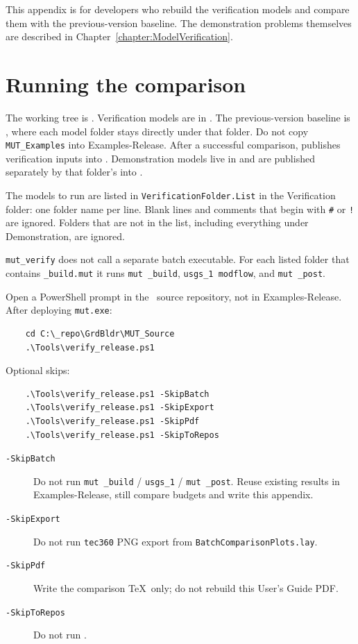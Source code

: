 \label{appendix:release_verification}
This appendix is for developers who rebuild the verification models and compare them with the previous-version baseline. The demonstration problems themselves are described in Chapter~\ref{chapter:ModelVerification}.

\section{Running the comparison}
The working tree is . Verification models are in . The previous-version baseline is , where each model folder stays directly under that folder. Do not copy \texttt{MUT\_Examples} into Examples-Release. After a successful comparison,  publishes verification inputs into . Demonstration models live in  and are published separately by that folder's  into .

The models to run are listed in \texttt{VerificationFolder.List} in the Verification folder: one folder name per line. Blank lines and comments that begin with \texttt{\#} or \texttt{!} are ignored. Folders that are not in the list, including everything under Demonstration, are ignored.

\texttt{mut\_verify} does not call a separate batch executable. For each listed folder that contains \texttt{\_build.mut} it runs \texttt{mut \_build}, \texttt{usgs\_1 modflow}, and \texttt{mut \_post}.

Open a PowerShell prompt in the \mut\ source repository, not in Examples-Release. After deploying \texttt{mut.exe}:
\begin{verbatim}
    cd C:\_repo\GrdBldr\MUT_Source
    .\Tools\verify_release.ps1
\end{verbatim}
Optional skips:
\begin{verbatim}
    .\Tools\verify_release.ps1 -SkipBatch
    .\Tools\verify_release.ps1 -SkipExport
    .\Tools\verify_release.ps1 -SkipPdf
    .\Tools\verify_release.ps1 -SkipToRepos
\end{verbatim}
\begin{description}
    \item[\texttt{-SkipBatch}] Do not run \texttt{mut \_build} / \texttt{usgs\_1} / \texttt{mut \_post}. Reuse existing results in Examples-Release, still compare budgets and write this appendix.
    \item[\texttt{-SkipExport}] Do not run \texttt{tec360} PNG export from \texttt{BatchComparisonPlots.lay}.
    \item[\texttt{-SkipPdf}] Write the comparison \TeX\ only; do not rebuild this User's Guide PDF.
    \item[\texttt{-SkipToRepos}] Do not run .
\end{description}

